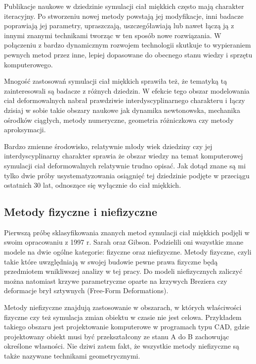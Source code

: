 Publikacje naukowe w dziedzinie symulacji ciał miękkich często mają charakter
iteracyjny. Po stworzeniu nowej metody powstają jej modyfikacje, inni badacze
poprawiają jej parametry, upraszczają,
uszczegóławiają lub nawet łączą ją z innymi znanymi technikami tworząc w ten
sposób nowe rozwiązania. W połączeniu z bardzo dynamicznym rozwojem technologii 
skutkuje to wypieraniem pewnych metod przez inne, lepiej dopasowane do obecnego
stanu wiedzy i sprzętu komputerowego.

Mnogość zastosowań symulacji ciał miękkich sprawiła też, że tematyką tą
zainteresowali są badacze z różnych dziedzin. W efekcie tego obszar modelowania ciał
deformowalnych nabrał prawdziwie interdyscyplinarnego charakteru i łączy dzisiaj w sobie
takie obszary naukowe jak dynamika newtonowska, mechanika ośrodków ciągłych,
metody numeryczne, geometria różniczkowa czy metody aproksymacji\cite{pbdo}.

Bardzo zmienne środowisko, relatywnie młody wiek dziedziny czy jej 
interdyscyplinarny charakter sprawia
że obszar wiedzy na temat komputerowej symulacji ciał deformowalnych relatywnie
trudno opisać.
Jak dotąd znane są mi tylko dwie próby usystematyzowania osiągnięć
tej dziedzinie podjęte w przeciągu ostatnich 30 lat, odnoszące się wyłącznie do
ciał miękkich.

\subsection{Metody fizyczne i niefizyczne}

Pierwszą próbę sklasyfikowania znanych metod symulacji ciał miękkich
podjęli w swoim opracowaniu z 1997 r. Sarah oraz Gibson\cite{TR97-19}. Podzielili
oni wszystkie znane modele na dwie ogólne kategorie: fizyczne oraz niefizyczne. Metody fizyczne, czyli
takie które uwzględniają w swojej budowie pewne prawa fizyczne będą przedmiotem
wnikliwszej analizy w tej pracy. Do modeli niefizycznych zaliczyć można natomiast
krzywe parametryczne oparte na krzywych Breziera czy deformacje brył sztywnych (Free-Form Deformations).\cite{pbdo}

Metody niefizyczne znajdują zastosowanie w obszarach, w których właściwości
fizyczne czy też symulacja zmian obiektu w czasie nie jest celowa. Przykładem
takiego obszaru jest projektowanie komputerowe w programach typu CAD, gdzie
projektowany obiekt musi być przekształcony ze stanu A do B zachowując określone
własności. Nie dziwi zatem fakt, że wszystkie metody niefizyczne są także 
nazywane technikami geometrycznymi.

